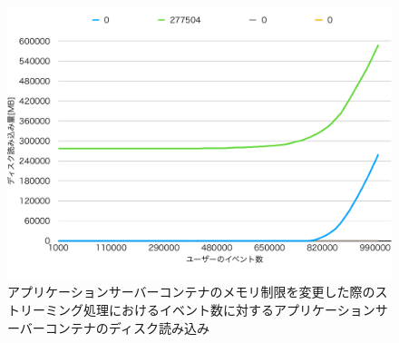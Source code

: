 \documentclass[../../../../../main]{subfiles}
\begin{document}
    \begin{figure}[H]
        \centering
        \includegraphics[width=12cm]{graph}
        \caption{アプリケーションサーバーコンテナのメモリ制限を変更した際のストリーミング処理におけるイベント数に対するアプリケーションサーバーコンテナのディスク読み込み}
        \label{fig:stream-change-app-memory-limit-app-disk-out-app_4_db_1_1024}
    \end{figure}
\end{document}
